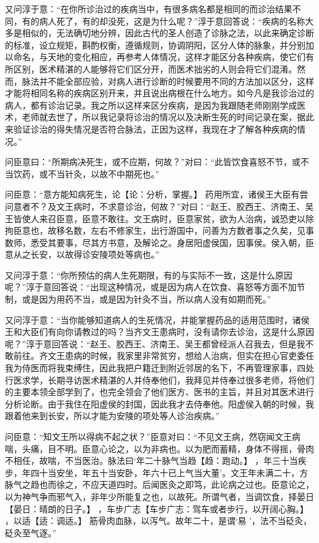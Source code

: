 \documentclass[12pt,UTF8]{ctexbook}
\begin{document}
又问淳于意：“在你所诊治过的疾病当中，有很多病名都是相同的而诊治结果不同，有的病人死了，有的却没死，这是为什么呢？”淳于意回答说：“疾病的名称大多是相似的，无法确切地分辨，因此古代的圣人创造了诊脉之法，以此来确定诊断的标准，设立规矩，斟酌权衡，遵循规则，协调阴阳，区分人体的脉象，并分别加以命名，与天地的变化相应，再参考人体情况，这样才能区分各种疾病，使它们有所区别，医术精湛的人能够将它们区分开，而医术拙劣的人则会将它们混淆。然而，脉法并不能全部应验，对病人进行诊断的时候要用不同的方法加以区分，这样才能将相同名称的疾病区别开来，并且说出病根在什么地方。如今凡是我诊治过的病人，都有诊治记录。我之所以这样来区分疾病，是因为我跟随老师刚刚学成医术，老师就去世了，所以我记录将诊治的情况以及决断生死的时间记录在案，据此来验证诊治的得失情况是否符合脉法，正因为这样，我现在才了解各种疾病的情况。”

问臣意曰：“所期病决死生，或不应期，何故？”对曰：“此皆饮食喜怒不节，或不当饮药，或不当针灸，以故不中期死也。”

问臣意：“意方能知病死生，论【论：分析，掌握。】 药用所宜，诸侯王大臣有尝问意者不？及文王病时，不求意诊治，何故？”对曰：“赵王、胶西王、济南王、吴王皆使人来召臣意，臣意不敢往。文王病时，臣意家贫，欲为人治病，诚恐吏以除拘臣意也，故移名数，左右不修家生，出行游国中，问善为方数者事之久矣，见事数师，悉受其要事，尽其方书意，及解论之。身居阳虚侯国，因事侯。侯入朝，臣意从之长安，以故得诊安陵项处等病也。”

又问淳于意：“你所预估的病人生死期限，有的与实际不一致，这是什么原因呢？”淳于意回答说：“出现这种情况，或是因为病人在饮食、喜怒等方面不加节制，或是因为用药不当，或是因为针灸不当，所以病人没有如期而死。”

又问淳于意：“当你能够知道病人的生死情况，并能掌握药品的适用范围时，诸侯王和大臣们有向你请教过的吗？当齐文王患病时，没有请你去诊治，这是什么原因呢？”淳于意回答说：“赵王、胶西王、济南王、吴王都曾经派人召我去，但是我不敢前往。齐文王患病的时候，我家里非常贫穷，想给人治病，但实在担心官吏委任我为侍医而将我束缚住，因此我把户籍迁到附近邻居的名下，不再管理家事，四处行医求学，长期寻访医术精湛的人并侍奉他们，我拜见并侍奉过很多老师，将他们的主要本领全部学到了，也完全领会了他们医方、医书的主旨，并且对其医术进行分析论断。由于我住在阳虚侯的封国，因此我才去侍奉他。阳虚侯入朝的时候，我跟着他来到长安，所以才能为安陵的项处等人诊治疾病。”

问臣意：“知文王所以得病不起之状？”臣意对曰：“不见文王病，然窃闻文王病喘，头痛，目不明。臣意心论之，以为非病也。以为肥而蓄精，身体不得摇，骨肉不相任，故喘，不当医治。脉法曰‘年二十脉气当趋【趋：跑动。】 ，年三十当疾步，年四十当安坐，年五十当安卧，年六十已上气当大董’。文王年未满二十，方脉气之趋也而徐之，不应天道四时。后闻医灸之即笃，此论病之过也。臣意论之，以为神气争而邪气入，非年少所能复之也，以故死。所谓气者，当调饮食，择晏日【晏日：晴朗的日子。】 ，车步广志【车步广志：驾车或者步行，以开阔心胸。】 ，以适【适：调适。】 筋骨肉血脉，以泻气。故年二十，是谓‘易 ’，法不当砭灸，砭灸至气逐。”
\end{document}
